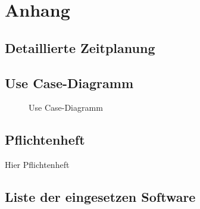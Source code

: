  \section{Anhang}
 \subsection{Detaillierte Zeitplanung}
 \label{app:Zeitplanung}



\clearpage
 \subsection{Use Case-Diagramm}\label{usecasediagram}
 \label{app:UseCase}
 \begin{figure}[htb]
 \centering
 \caption{Use Case-Diagramm}

 \end{figure}

% 

 \clearpage

 
 \clearpage
 \subsection{Pflichtenheft}\label{pflichtenheft}
 Hier Pflichtenheft
 \clearpage

\subsection{Liste der eingesetzen
Software}\label{liste-der-eingesetzen-software}

